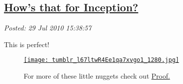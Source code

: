 %

\subsection*{\href{http://bakerjd99.wordpress.com/2010/07/29/hows-that-for-inception/}{How's that for Inception?}}


\noindent\emph{Posted: 29 Jul 2010 15:38:57}
\vspace{6pt}

This is perfect!


\captionsetup[figure]{labelformat=empty}
\begin{figure}[htbp]
  \centering
\href{http://proofmathisbeautiful.tumblr.com/post/875272253/fuckyeahmath-riceeater-okay-one-more}{\texttt{[image: tumblr\_l67ltwR4Ee1qa7xvgo1\_1280.jpg]}}
\caption{ 
For more of these little nuggets check out
\href{http://proofmathisbeautiful.tumblr.com/}{Proof.}
}
\label{fig:710X0}
\end{figure}




%